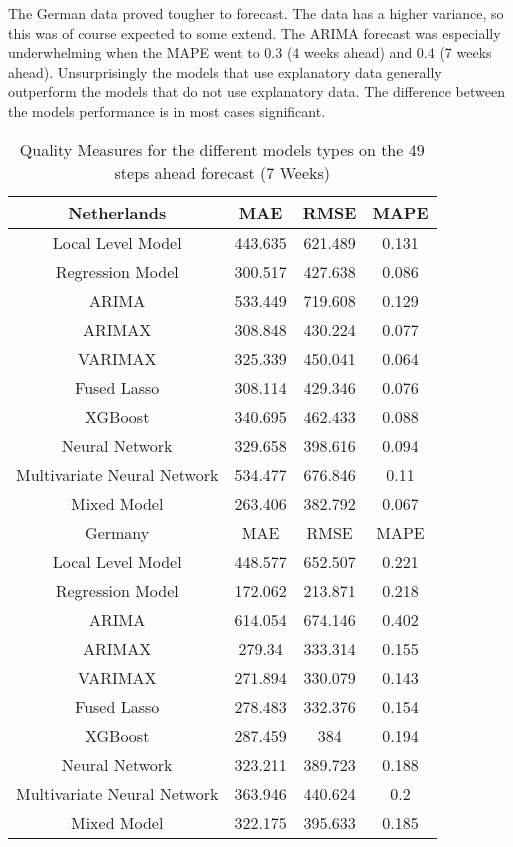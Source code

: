 The German data proved tougher to forecast. The data has a higher variance, so this was of course expected to some extend. The ARIMA forecast was especially underwhelming when the MAPE went to 0.3 (4 weeks ahead) and 0.4 (7 weeks ahead). Unsurprisingly the models that use explanatory data generally outperform the models that do not use explanatory data. The difference between the models performance is in most cases significant.\\

\begin{table}[]
    \centering
    \begin{tabular}{|c|c c c|}\hline
        Netherlands & MAE & RMSE & MAPE\\\hline
        Local Level Model & 443.635 & 621.489 & 0.131\\
        Regression Model & 300.517 & 427.638 & 0.086\\
        ARIMA & 533.449 & 719.608 & 0.129\\
        ARIMAX & 308.848 & 430.224 & 0.077\\
        VARIMAX & 325.339 & 450.041 & 0.064\\
        Fused Lasso & 308.114 & 429.346 & 0.076\\
        XGBoost & 340.695 & 462.433 & 0.088\\
        Neural Network & 329.658 & 398.616 & 0.094\\
        Multivariate Neural Network & 534.477 & 676.846 & 0.11\\
        Mixed Model & 263.406 & 382.792 & 0.067\\\hline
        Germany & MAE & RMSE & MAPE\\\hline
        Local Level Model & 448.577 & 652.507 & 0.221\\
        Regression Model & 172.062 & 213.871 & 0.218\\
        ARIMA & 614.054 & 674.146 & 0.402\\
        ARIMAX & 279.34 & 333.314 & 0.155\\
        VARIMAX & 271.894 & 330.079 & 0.143\\
        Fused Lasso & 278.483 & 332.376 & 0.154\\
        XGBoost & 287.459 & 384 & 0.194\\
        Neural Network & 323.211 & 389.723 & 0.188\\
        Multivariate Neural Network & 363.946 & 440.624 & 0.2\\
        Mixed Model & 322.175 & 395.633 & 0.185\\
        \hline
    \end{tabular}
    \caption{Quality Measures for the different models types on the 49 steps ahead forecast (7 Weeks)}
    \label{tab:7 weeks ahead}
\end{table}

